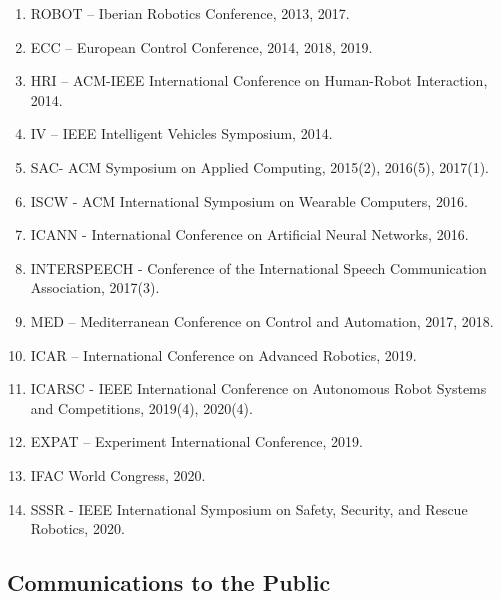 \documentclass[
]{article}
\begin{document}
\begin{enumerate}
\item
  ROBOT -- Iberian Robotics Conference, 2013, 2017.
\item
  ECC -- European Control Conference, 2014, 2018, 2019.
\item
  HRI -- ACM-IEEE International Conference on Human-Robot Interaction,
  2014.
\item
  IV -- IEEE Intelligent Vehicles Symposium, 2014.
\item
  SAC- ACM Symposium on Applied Computing, 2015(2), 2016(5), 2017(1).
\item
  ISCW - ACM International Symposium on Wearable Computers, 2016.
\item
  ICANN - International Conference on Artificial Neural Networks, 2016.
\item
  INTERSPEECH - Conference of the International Speech Communication
  Association, 2017(3).
\item
  MED -- Mediterranean Conference on Control and Automation, 2017, 2018.
\item
  ICAR -- International Conference on Advanced Robotics, 2019.
\item
  ICARSC - IEEE International Conference on Autonomous Robot Systems and
  Competitions, 2019(4), 2020(4).
\item
  EXPAT -- Experiment International Conference, 2019.
\item
  IFAC World Congress, 2020.
\item
  SSSR - IEEE International Symposium on Safety, Security, and Rescue
  Robotics, 2020.
\end{enumerate}

\subsection{Communications to the
Public}\label{communications-to-the-public}
\end{document}
